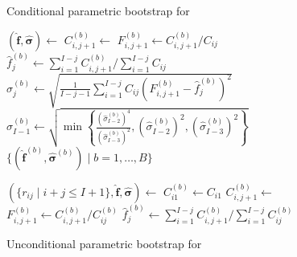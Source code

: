 \documentclass[a4paper]{book}
\begin{document}
\begin{figure}[p]
  \begin{algorithm}[H]
    \caption{Conditional parametric bootstrap for }
    \label{alg:cond-param-mack}
    \begin{algorithmic}
      \State $(\bm{\widehat{f}}, \bm{\widehat{\sigma}}) \gets$ 
            \State $C^{(b)}_{i, j + 1} \gets$ 
            \State $\displaystyle F^{(b)}_{i, j + 1} \gets C^{(b)}_{i, j + 1} / C_{ij}$
          \EndFor
          \State $\widehat{f}^{(b)}_j \gets \sum_{i = 1}^{I - j} C^{(b)}_{i, j + 1} / \sum_{i = 1}^{I - j} C_{ij}$
            \State $\displaystyle \widehat{\sigma}^{(b)}_j \gets \sqrt{\frac{1}{I - j - 1}\sum_{i = 1}^{I - j} C_{ij} \left( F^{(b)}_{i, j + 1} - \widehat{f}^{(b)}_j \right)^2}$
          \Else
            \State $\widehat{\sigma}^{(b)}_{I - 1} \gets \sqrt{\min{ \left \{ \displaystyle \frac{(\widehat{\sigma}^{(b)}_{I - 2})^4}{(\widehat{\sigma}^{(b)}_{I - 3})^2}, (\widehat{\sigma}^{(b)}_{I - 2})^2, (\widehat{\sigma}^{(b)}_{I - 3})^2 \right \} }}$
          \EndIf
        \EndFor
      \EndFor
      \State \Return $\{ (\widehat{\bm{f}}^{(b)}, \widehat{\bm{\sigma}}^{(b)}) \mid b = 1, \dots, B \}$
    \end{algorithmic}
  \end{algorithm}
  \begin{algorithm}[H]
    \caption{Unconditional parametric bootstrap for }
    \label{alg:uncond-param-mack}
    \begin{algorithmic}
      \State $(\{ r_{ij} \mid i + j \leq I + 1 \}, \bm{\widehat{f}}, \bm{\widehat{\sigma}}) \gets$ 
          \State $C^{(b)}_{i1} \gets C_{i1}$
        \EndFor
            \State $C^{(b)}_{i, j + 1} \gets$ 
            \State $\displaystyle F^{(b)}_{i, j + 1} \gets C^{(b)}_{i, j + 1} / C^{(b)}_{ij}$
          \EndFor
          \State $\widehat{f}^{(b)}_j \gets \sum_{i = 1}^{I - j} C^{(b)}_{i, j + 1} / \sum_{i = 1}^{I - j} C^{(b)}_{ij}$

\end{algorithmic}
\end{algorithm}
\end{figure}
\end{document}
